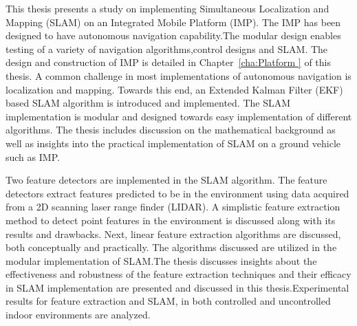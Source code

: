 {}
{

This thesis presents a study on implementing Simultaneous Localization and Mapping (SLAM) on an Integrated Mobile Platform (IMP). The IMP has been designed to have autonomous navigation capability.The modular design enables testing of a variety of navigation algorithms,control designs and SLAM. The design and construction of IMP is detailed in Chapter~\ref{cha:Platform } of this thesis. A common challenge in most implementations of autonomous navigation is localization and mapping. Towards this end, an Extended Kalman Filter (EKF) based SLAM algorithm is introduced and implemented. The SLAM implementation is modular and designed towards easy implementation of different algorithms. The thesis includes discussion on the mathematical background as well as insights into the practical implementation of SLAM on a ground vehicle such as IMP. 

Two feature detectors are implemented in the SLAM algorithm. The feature detectors extract features predicted to be in the environment using data acquired from a 2D scanning laser range finder (LIDAR). A simplistic feature extraction method to detect point features in the environment is discussed along with its results and drawbacks. Next, linear feature extraction algorithms are discussed, both conceptually and practically. The algorithms discussed are utilized in the modular implementation of SLAM.The thesis discusses insights about the effectiveness and robustness of the feature extraction techniques and their efficacy in SLAM implementation are presented and discussed in this thesis.Experimental results for feature extraction and SLAM, in both controlled and uncontrolled indoor environments are analyzed.
}
{\endmsabstract}